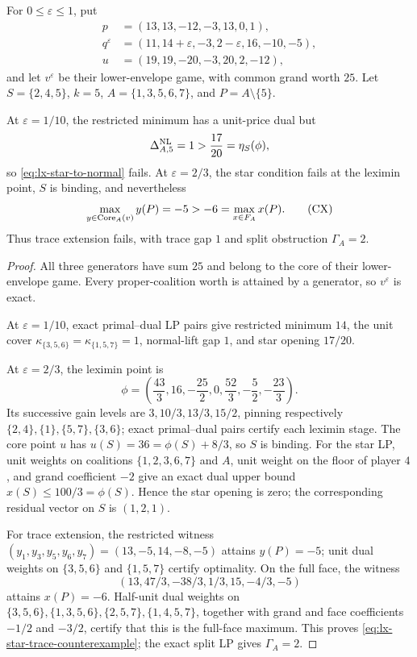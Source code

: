 \begin{proposition}
\label{prop:lx-star-trace-counterexample}
For $0\leq\varepsilon\leq1$, put
\begin{align*}
 p&=(13,13,-12,-3,13,0,1),\\
 q^\varepsilon&=(11,14+\varepsilon,-3,2-\varepsilon,16,-10,-5),\\
 u&=(19,19,-20,-3,20,2,-12),
\end{align*}
and let $v^\varepsilon$ be their lower-envelope game, with common grand worth
$25$.  Let $S=\{2,4,5\}$, $k=5$, $A=\{1,3,5,6,7\}$, and
$P=A\setminus\{5\}$.

At $\varepsilon=1/10$, the restricted minimum has a unit-price dual but
\[
 \Delta^{\rm NL}_{A,5}=1>\frac{17}{20}=\eta_S(\phi),
\]
so \eqref{eq:lx-star-to-normal} fails.  At $\varepsilon=2/3$, the star
condition fails at the leximin point, $S$ is binding, and nevertheless
\[
 \max_{y\in\operatorname{Core}_A(v)}y(P)=-5>-6=
 \max_{x\in F_A}x(P).
 \tag{CX}\label{eq:lx-star-trace-counterexample}
\]
Thus trace extension fails, with trace gap $1$ and split obstruction
$\Gamma_A=2$.
\end{proposition}

\begin{proof}
All three generators have sum $25$ and belong to the core of their
lower-envelope game.  Every proper-coalition worth is attained by a generator,
so $v^\varepsilon$ is exact.

At $\varepsilon=1/10$, exact primal--dual LP pairs give restricted minimum
$14$, the unit cover
$\kappa_{\{3,5,6\}}=\kappa_{\{1,5,7\}}=1$, normal-lift gap $1$, and star
opening $17/20$.

At $\varepsilon=2/3$, the leximin point is
\[
 \phi=\left(\frac{43}{3},16,-\frac{25}{2},0,
             \frac{52}{3},-\frac52,-\frac{23}{3}\right).
\]
Its successive gain levels are
$3,10/3,13/3,15/2$, pinning respectively
$\{2,4\},\{1\},\{5,7\},\{3,6\}$; exact primal--dual pairs certify each
leximin stage.  The core point $u$ has $u(S)=36=\phi(S)+8/3$, so $S$ is
binding.  For the star LP, unit weights on coalitions
$\{1,2,3,6,7\}$ and $A$, unit weight on the floor of player $4$, and grand
coefficient $-2$ give an exact dual upper bound $x(S)\leq100/3=\phi(S)$.
Hence the star opening is zero; the corresponding residual vector on $S$ is
$(1,2,1)$.

For trace extension, the restricted witness
$(y_1,y_3,y_5,y_6,y_7)=(13,-5,14,-8,-5)$ attains $y(P)=-5$; unit dual
weights on $\{3,5,6\}$ and $\{1,5,7\}$ certify optimality.  On the full
face, the witness
\[
 (13,47/3,-38/3,1/3,15,-4/3,-5)
\]
attains $x(P)=-6$.  Half-unit dual weights on
$\{3,5,6\},\{1,3,5,6\},\{2,5,7\},\{1,4,5,7\}$, together with grand and
face coefficients $-1/2$ and $-3/2$, certify that this is the full-face
maximum.  This proves \eqref{eq:lx-star-trace-counterexample}; the exact split
LP gives $\Gamma_A=2$.
\end{proof}

